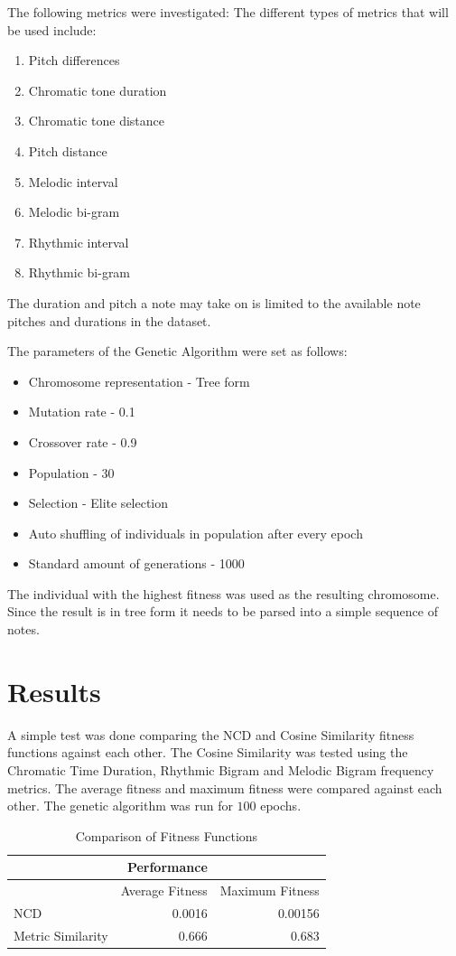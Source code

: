 The following metrics were investigated:
The different types of metrics that will be used include:
\begin{enumerate}
\item Pitch differences
\item Chromatic tone duration 
\item Chromatic tone distance 
\item Pitch distance
\item Melodic interval
\item Melodic bi-gram
\item Rhythmic interval 
\item Rhythmic bi-gram
\end{enumerate}

The duration and pitch a note may take on is limited to the available note pitches and durations in the dataset.

The parameters of the Genetic Algorithm were set as follows:
\begin{itemize}
\item Chromosome representation - Tree form
\item Mutation rate - 0.1
\item Crossover rate - 0.9
\item Population - 30
\item Selection - Elite selection
\item Auto shuffling of individuals in population after every epoch
\item Standard amount of generations - 1000
\end{itemize}

The individual with the highest fitness was used as the resulting chromosome. 
Since the result is in tree form it needs to be parsed into a simple sequence of notes.

\section{Results}


A simple test was done comparing the \ac{NCD} and Cosine Similarity fitness functions against each other. The Cosine Similarity was tested using the Chromatic Time Duration, Rhythmic Bigram and Melodic Bigram frequency metrics. The average fitness and maximum fitness were compared against each other. The genetic algorithm was run for $100$ epochs.

\begin{table}[htbp]
  \centering
  \caption{Comparison of Fitness Functions}
    \begin{tabular}{l|rr}
    \toprule
          & Performance &  \\
    \midrule
          & Average Fitness & Maximum Fitness \\
    NCD   & 0.0016 & 0.00156 \\
    Metric Similarity & 0.666 & 0.683 \\
    \bottomrule
    \end{tabular}%
  \label{tab:ffcompare}%
\end{table}%

